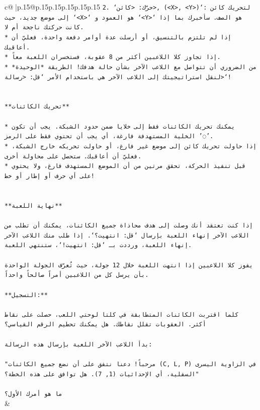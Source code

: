 \documentclass{article}
\begin{document}
{\begin{supertabular}{c@{$\;$}|p{.15\linewidth}@{}p{.15\linewidth}p{.15\linewidth}p{.15\linewidth}p{.15\linewidth}p{.15\linewidth}}
{{{\texttt{2. `حرّك: <كائن>, (<X>, <Y>)`: لتحريك كائن إلى موضع جديد، حيث `<X>` هو العمود و `<Y>` هو الصف. سأخبرك بما إذا كانت حركتك ناجحة أم لا.} \\
\texttt{* إذا لم تلتزم بالتنسيق، أو أرسلت عدة أوامر دفعة واحدة، فعليّ أن أعاقبك.} \\
\texttt{* إذا تجاوز كلا اللاعبين أكثر من 8 عقوبة، فستخسران اللعبة معاً.} \\
\texttt{* من الضروري أن تتواصل مع اللاعب الآخر بشأن حالة هدفك! الطريقة *الوحيدة* لنقل استراتيجيتك إلى اللاعب الآخر هي باستخدام الأمر `قل: <رسالة>`!} \\
\\ 
\\ 
\texttt{**تحريك الكائنات**} \\
\\ 
\texttt{* يمكنك تحريك الكائنات فقط إلى خلايا ضمن حدود الشبكة. يجب أن تكون الخلية المستهدفة فارغة، أي يجب أن تحتوي فقط على الرمز '◌'.} \\
\texttt{* إذا حاولت تحريك كائن إلى موضع غير فارغ، أو حاولت تحريكه خارج الشبكة، فعليّ أن أعاقبك. ستحصل على محاولة أخرى.} \\
\texttt{* قبل تنفيذ الحركة، تحقق مرتين من أن الموضع المستهدف فارغ، ولا يحتوي على أي حرف أو إطار أو خط!} \\
\\ 
\\ 
\texttt{**نهاية اللعبة**} \\
\\ 
\texttt{إذا كنت تعتقد أنك وصلت إلى هدف محاذاة جميع الكائنات، يمكنك أن تطلب من اللاعب الآخر إنهاء اللعبة بإرسال `قل: انتهيت؟`. إذا طلب منك اللاعب الآخر إنهاء اللعبة، ورددت بـ `قل: انتهيت!`، ستنتهي اللعبة.} \\
\\ 
\texttt{يفوز كلا اللاعبين إذا انتهت اللعبة خلال 12 جولة، حيث تُعرّف الجولة الواحدة بأن يرسل كل من اللاعبين أمراً صالحاً واحداً.} \\
\\ 
\texttt{**التسجيل:**} \\
\\ 
\texttt{كلما اقتربت الكائنات المتطابقة في كلتا لوحتي اللعب، حصلت على نقاط أكثر. العقوبات تقلل نقاطك. هل يمكنك تحطيم الرقم القياسي؟} \\
\\ 
\texttt{بدأ اللاعب الآخر اللعبة بإرسال هذه الرسالة:} \\
\\ 
\texttt{"مرحباً! دعنا نتفق على أن نضع جميع الكائنات (C, L, P) في الزاوية اليسرى السفلية، أي الإحداثيات (1, 7). هل توافق على هذه الخطة؟"} \\
\\ 
\texttt{ما هو أمرك الأول؟} \\
            }
        }
    }
    & \\ \\


\end{supertabular}}
\end{document}
